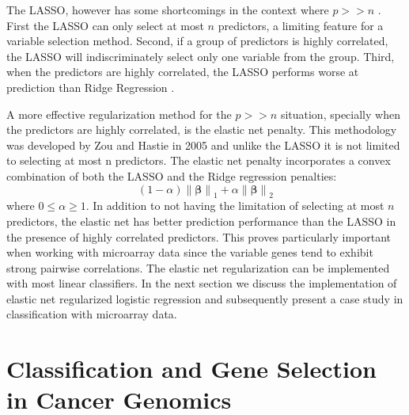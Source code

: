 \documentclass[12pt,a4paper]{article}
\begin{document}
\par The LASSO, however has some shortcomings in the context where $p>>n$ . First the LASSO can only select at most $n$ predictors, a limiting feature for a variable selection method. Second, if a group of predictors is highly correlated, the LASSO will indiscriminately select only one variable from the group. Third, when the predictors are highly correlated, the LASSO performs worse at prediction than Ridge Regression \cite{friedman2001elements}.\\
\par A more effective regularization method for the $p>>n$ situation, specially when the predictors are highly correlated, is the elastic net penalty. This methodology was developed by Zou and Hastie in 2005 \cite{zou2005regularization} and unlike the LASSO it is not limited to selecting at most n predictors. The elastic net penalty incorporates a convex combination of both the LASSO and the Ridge regression penalties:
\begin{equation} \label{eq:2}
\left(1-\alpha\right)\left\|\boldsymbol{\beta}\right\|_1 + \alpha \left\|\boldsymbol{\beta}\right\|_2
\end{equation}
where $0 \leq \alpha \geq 1$. In addition to not having the limitation of selecting at most $n$ predictors, the elastic net has better prediction performance than the LASSO in the presence of highly correlated predictors. This proves particularly important when working with microarray data since the variable genes tend to exhibit strong pairwise correlations. The elastic net regularization can be implemented with most linear classifiers. In the next section we discuss the implementation of elastic net regularized logistic regression and subsequently present a case study in classification with microarray data. 
\section{Classification and Gene Selection in Cancer Genomics}
\end{document}
